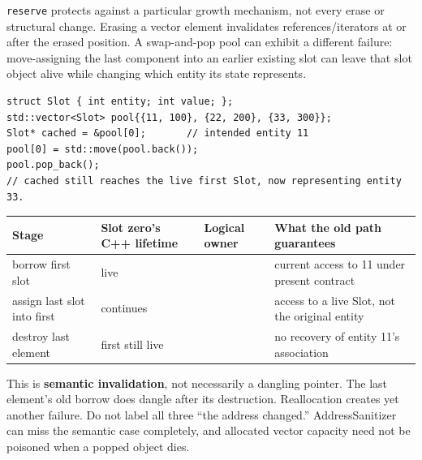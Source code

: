 \texttt{reserve} protects against a particular growth mechanism, not every erase or structural change. Erasing a vector element invalidates references/iterators at or after the erased position. A swap-and-pop pool can exhibit a different failure: move-assigning the last component into an earlier existing slot can leave that slot object alive while changing which entity its state represents.

\begin{verbatim}
struct Slot { int entity; int value; };
std::vector<Slot> pool{{11, 100}, {22, 200}, {33, 300}};
Slot* cached = &pool[0];       // intended entity 11
pool[0] = std::move(pool.back());
pool.pop_back();
// cached still reaches the live first Slot, now representing entity 33.
\end{verbatim}

{\def\LTcaptype{none} %
\begin{longtable}[]{@{}
  >{\raggedright\arraybackslash}p{}
  >{\raggedright\arraybackslash}p{}
  >{\raggedright\arraybackslash}p{}
  >{\raggedright\arraybackslash}p{}@{}}
\toprule\noalign{}
\begin{minipage}[b]{\linewidth}\raggedright
Stage
\end{minipage} & \begin{minipage}[b]{\linewidth}\raggedright
Slot zero's C++ lifetime
\end{minipage} & \begin{minipage}[b]{\linewidth}\raggedright
Logical owner
\end{minipage} & \begin{minipage}[b]{\linewidth}\raggedright
What the old path guarantees
\end{minipage} \\
\midrule\noalign{}
\endhead
\bottomrule\noalign{}
\endlastfoot
borrow first slot & live & 11 & current access to 11 under present contract \\
assign last slot into first & continues & 33 & access to a live Slot, not the original entity \\
destroy last element & first still live & 33 & no recovery of entity 11's association \\
\end{longtable}
}

This is \textbf{semantic invalidation}, not necessarily a dangling pointer. The last element's old borrow does dangle after its destruction. Reallocation creates yet another failure. Do not label all three ``the address changed.'' AddressSanitizer can miss the semantic case completely, and allocated vector capacity need not be poisoned when a popped object dies.

